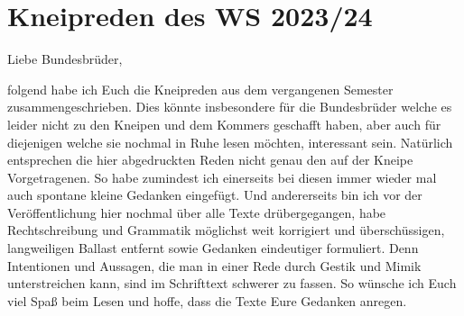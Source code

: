 \section{Kneipreden des WS 2023/24}


Liebe Bundesbrüder,

folgend habe ich Euch die Kneipreden aus dem vergangenen Semester zusammengeschrieben. Dies könnte insbesondere für die Bundesbrüder welche es leider nicht zu den Kneipen und dem Kommers geschafft haben, aber auch für diejenigen welche sie nochmal in Ruhe lesen möchten, interessant sein. Natürlich entsprechen die hier abgedruckten Reden nicht genau den auf der Kneipe Vorgetragenen. So habe zumindest ich einerseits bei diesen immer wieder mal auch spontane kleine Gedanken eingefügt. Und andererseits bin ich vor der Veröffentlichung hier nochmal über alle Texte drübergegangen, habe Rechtschreibung und Grammatik möglichst weit korrigiert und überschüssigen, langweiligen Ballast entfernt sowie Gedanken eindeutiger formuliert. Denn Intentionen und Aussagen, die man in einer Rede durch Gestik und Mimik unterstreichen kann, sind im Schrifttext schwerer zu fassen. So wünsche ich Euch viel Spaß beim Lesen und hoffe, dass die Texte Eure Gedanken anregen.
\\

